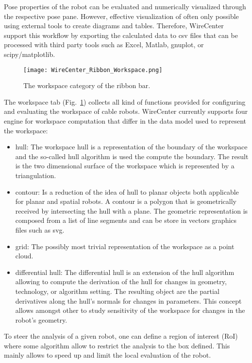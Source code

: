\documentclass[11pt,a4paper,onepage,openany]{book}
\begin{document}
Pose properties of the robot can be evaluated and numerically visualized
through the respective pose pane. However, effective visualization of often
only possible using external tools to create diagrams and tables. Therefore,
WireCenter support this workflow by exporting the calculated data to csv files
that can be processed with third party tools such as Excel, Matlab, gnuplot, or
scipy/matplotlib.

\begin{figure}[t]
  \centering
  \texttt{[image: WireCenter\_Ribbon\_Workspace.png]}
  \caption{The workspace category of the ribbon bar.}\label{fig:WireCenterRibbonWorkspace}
\end{figure}

The workspace tab (Fig.~\ref{fig:WireCenterRibbonWorkspace}) collects all kind of functions provided for configuring and evaluating the workspace of cable robots. WireCenter currently supports four engine for workspace computation that differ in the data model used to represent the workspace:
\begin{itemize}
  \item hull: The workspace hull is a representation of the boundary of the workspace and the so-called hull algorithm is used the compute the boundary. The result is the two dimensional surface of the workspace which is represented by a triangulation.
  \item contour: Is a reduction of the idea of hull to planar objects both applicable for planar and spatial robots. A contour is a polygon that is geometrically received by intersecting the hull with a plane. The geometric representation is composed from a list of line segments and can be store in vectors graphics files such as svg.
  \item grid: The possibly most trivial representation of the workspace as a point cloud.
  \item differential hull: The differential hull is an extension of the hull algorithm allowing to compute the derivation of the hull for changes in geometry, technology, or algorithm setting. The resulting object are the partial derivatives along the hull's normals for changes in parameters. This concept allows amongst other to study sensitivity of the workspace for changes in the robot's geometry.
\end{itemize}

To steer the analysis of a given robot, one can define a region of interest (RoI) where some algorithm allow to restrict the analysis to the box defined. This mainly allows to speed up and limit the local evaluation of the robot.
\end{document}
